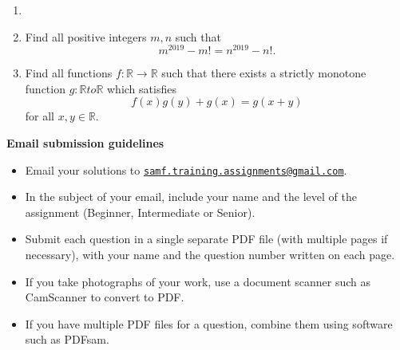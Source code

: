 \documentclass{article}
\begin{document}
\begin{enumerate}[1.]
\vspace{6pt}
\item


\vspace{6pt}
\item %

Find all positive integers $m, n$ such that
$$ m^{2019} - m! = n^{2019} - n! . $$


\vspace{6pt}
\item %

Find all functions $f : \mathbb{R} \to \mathbb{R}$ such that there exists a strictly monotone function $g : \mathbb{R} to \mathbb{R}$ which satisfies
$$ f(x)g(y) + g(x) = g(x+y) $$
for all $x, y \in \mathbb{R}$.

\end{enumerate}


\vfill
\textbf{\Large Email submission guidelines}
\begin{itemize}
	\item Email your solutions to \href{mailto:samf.training.assignments@gmail.com}{\texttt{samf.training.assignments@gmail.com}}.
	\item In the subject of your email, include your name and the level of the assignment (Beginner, Intermediate or Senior).
	\item Submit each question in a single separate PDF file (with multiple pages if necessary), with your name and the question number written on each page.
	\item If you take photographs of your work, use a document scanner such as CamScanner to convert to PDF.
	\item If you have multiple PDF files for a question, combine them using software such as PDFsam.
\end{itemize}
\end{document}
